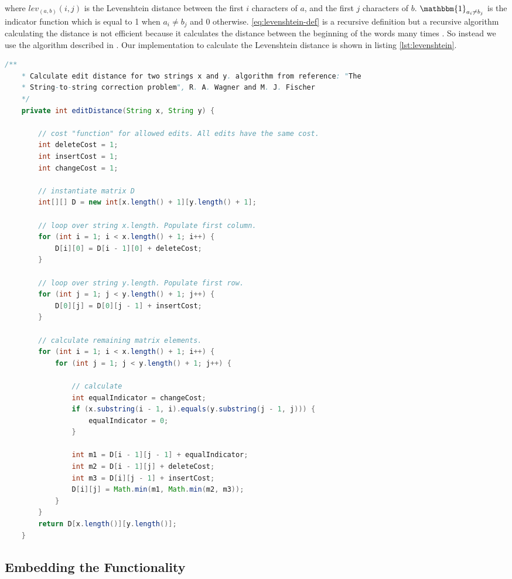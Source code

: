 where \(lev_{(a,b)}(i,j)\) is the Levenshtein distance between the first \(i\) characters of \(a\), and the first \(j\) characters of \(b\). \(\mathbbm{1}_{a_{i} \neq b_{j}}\) is the indicator function which is equal to 1 when \(a_{i} \neq b_{j}\) and 0 otherwise.
\eqref{eq:levenshtein-def} is a recursive definition but a recursive algorithm calculating the distance is not efficient because it calculates the distance between the beginning of the words many times \cite{wikiLeven}. So instead we use the algorithm described in \cite{WF1974}. Our implementation to calculate the Levenshtein distance is shown in listing \ref{lst:levenshtein}.
 
\begin{lstlisting}[language=Java, caption=This is a code example., label=lst:2-gram]
	/**
	* Calculate edit distance for two strings x and y. algorithm from reference: "The
	* String-to-string correction problem", R. A. Wagner and M. J. Fischer
	*/
	private int editDistance(String x, String y) {
	
		// cost "function" for allowed edits. All edits have the same cost.
		int deleteCost = 1;
		int insertCost = 1;
		int changeCost = 1;
		
		// instantiate matrix D
		int[][] D = new int[x.length() + 1][y.length() + 1];
		
		// loop over string x.length. Populate first column.
		for (int i = 1; i < x.length() + 1; i++) {
			D[i][0] = D[i - 1][0] + deleteCost;
		}
		
		// loop over string y.length. Populate first row.
		for (int j = 1; j < y.length() + 1; j++) {
			D[0][j] = D[0][j - 1] + insertCost;
		}
		
		// calculate remaining matrix elements.
		for (int i = 1; i < x.length() + 1; i++) {
			for (int j = 1; j < y.length() + 1; j++) {
		
				// calculate
				int equalIndicator = changeCost;
				if (x.substring(i - 1, i).equals(y.substring(j - 1, j))) {
					equalIndicator = 0;
				}
		
				int m1 = D[i - 1][j - 1] + equalIndicator;
				int m2 = D[i - 1][j] + deleteCost;
				int m3 = D[i][j - 1] + insertCost;
				D[i][j] = Math.min(m1, Math.min(m2, m3));
			}
		}
		return D[x.length()][y.length()];
	}
\end{lstlisting}


\subsection{Embedding the Functionality}


